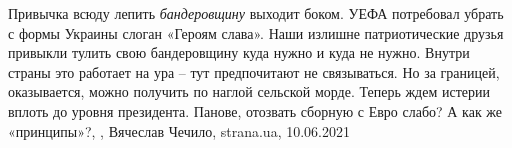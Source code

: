 Привычка всюду лепить \emph{бандеровщину} выходит боком.  УЕФА потребовал
убрать с формы Украины слоган «Героям слава».  Наши излишне патриотические
друзья привыкли тулить свою бандеровщину куда нужно и куда не нужно. Внутри
страны это работает на ура – тут предпочитают не связываться. Но за границей,
оказывается, можно получить по наглой сельской морде. Теперь ждем истерии
вплоть до уровня президента.  Панове, отозвать сборную с Евро слабо? А как же
«принципы»?,
, 
Вячеслав Чечило, strana.ua, 10.06.2021

